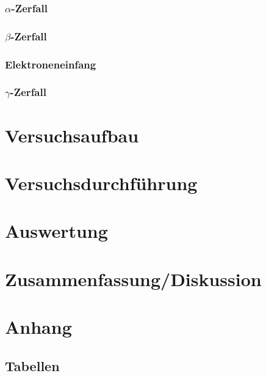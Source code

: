 \documentclass[12pt]{article}
\begin{document}
\subsubsection{$\alpha$-Zerfall}
\subsubsection{$\beta$-Zerfall}
\subsubsection{Elektroneneinfang}
\subsubsection{$\gamma$-Zerfall}


\newpage
\section{Versuchsaufbau}


\newpage
\section{Versuchsdurchführung}



\newpage
\section{Auswertung}


\newpage
\section{Zusammenfassung/Diskussion}


\newpage
\section{Anhang}

\subsection{Tabellen}

%


%
\end{document}
